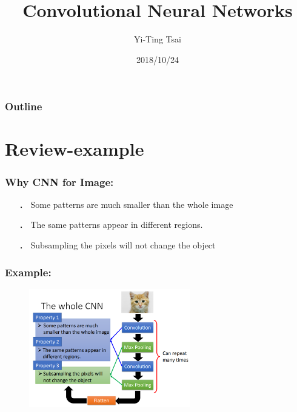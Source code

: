 \documentclass{beamer}
\title{Convolutional Neural Networks}
\author{Yi-Ting Tsai}
\institute{National Sun Yat-sen University}
\date{2018/10/24}
\begin{document}
		\begin{frame}
		\titlepage
        \end{frame}

        \begin{frame}
		\frametitle{Outline} %
		\tableofcontents %
        \end{frame}
\section{Review-example}
    \begin{frame}
    \frametitle{Why CNN for Image: }
        \begin{itemize}
            \item[．] Some patterns are much smaller than the whole image
            \item[．] The same patterns appear in different regions.
            \item[．] Subsampling the pixels will not change the object
        \end{itemize}
    \end{frame}

    \begin{frame}
    \frametitle{Example: }
        \begin{figure}[H]
            \begin{center}
                \includegraphics[width=7cm]{ppt1}
            \end{center}
        \end{figure}
    \end{frame}
\end{document}
